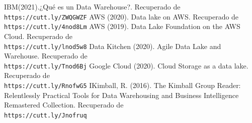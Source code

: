 \documentclass[twoside,twocolumn]{article}
\begin{document}
\begin{thebibliography}{99} 
    \bibitem{}
    IBM(2021).¿Qué es un Data Warehouse?. Recuperado de 
    \\\texttt{https://cutt.ly/ZWQGWZF}
    \bibitem{}
    AWS (2020). Data lake on AWS. Recuperado de 
    \\\texttt{https://cutt.ly/4nod8Lm}
    \bibitem{}
    AWS (2019). Data Lake Foundation on the AWS Cloud. Recuperado de 
    \\\texttt{https://cutt.ly/lnod5w8}
    \bibitem{}
    Data Kitchen (2020). Agile Data Lake and Warehouse. Recuperado de 
    \\\texttt{https://cutt.ly/Tnod6Bj}
    \bibitem{}
    Google Cloud (2020). Cloud Storage as a data lake. Recuperado de 
    \\\texttt{https://cutt.ly/RnofwG5}
    \bibitem{}
    IKimball, R. (2016). The Kimball Group Reader: Relentlessly Practical Tools for Data Warehousing and Business Intelligence Remastered Collection. Recuperado de 
    \\\texttt{https://cutt.ly/Jnofruq}
\end{thebibliography}
\end{document}
